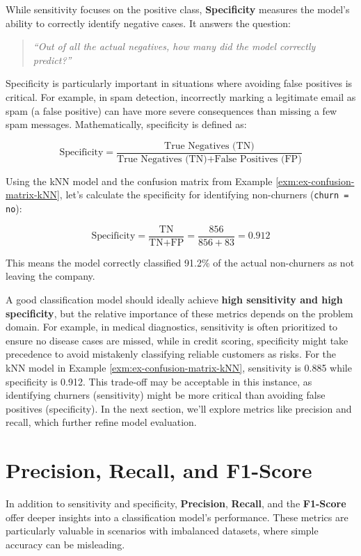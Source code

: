 \documentclass[
]{book}
\newcommand{\passthrough}[1]{#1}
\theoremstyle{definition}
\theoremstyle{definition}
\theoremstyle{definition}
\theoremstyle{definition}
\theoremstyle{remark}
\begin{document}
While sensitivity focuses on the positive class, \textbf{Specificity} measures the model's ability to correctly identify negative cases. It answers the question:

\begin{quote}
\emph{``Out of all the actual negatives, how many did the model correctly predict?''}
\end{quote}

Specificity is particularly important in situations where avoiding false positives is critical. For example, in spam detection, incorrectly marking a legitimate email as spam (a false positive) can have more severe consequences than missing a few spam messages. Mathematically, specificity is defined as:

\[
\text{Specificity} = \frac{\text{True Negatives (TN)}}{\text{True Negatives (TN)} + \text{False Positives (FP)}}
\]

Using the kNN model and the confusion matrix from Example \ref{exm:ex-confusion-matrix-kNN}, let's calculate the specificity for identifying non-churners (\passthrough{\lstinline!churn = no!}):

\[
\text{Specificity} = \frac{\text{TN}}{\text{TN} + \text{FP}} = \frac{856}{856 + 83} = 0.912
\]

This means the model correctly classified 91.2\% of the actual non-churners as not leaving the company.

A good classification model should ideally achieve \textbf{high sensitivity and high specificity}, but the relative importance of these metrics depends on the problem domain. For example, in medical diagnostics, sensitivity is often prioritized to ensure no disease cases are missed, while in credit scoring, specificity might take precedence to avoid mistakenly classifying reliable customers as risks. For the kNN model in Example \ref{exm:ex-confusion-matrix-kNN}, sensitivity is 0.885 while specificity is 0.912. This trade-off may be acceptable in this instance, as identifying churners (sensitivity) might be more critical than avoiding false positives (specificity). In the next section, we'll explore metrics like precision and recall, which further refine model evaluation.

\section{Precision, Recall, and F1-Score}\label{precision-recall-and-f1-score}

In addition to sensitivity and specificity, \textbf{Precision}, \textbf{Recall}, and the \textbf{F1-Score} offer deeper insights into a classification model's performance. These metrics are particularly valuable in scenarios with imbalanced datasets, where simple accuracy can be misleading.
\end{document}
